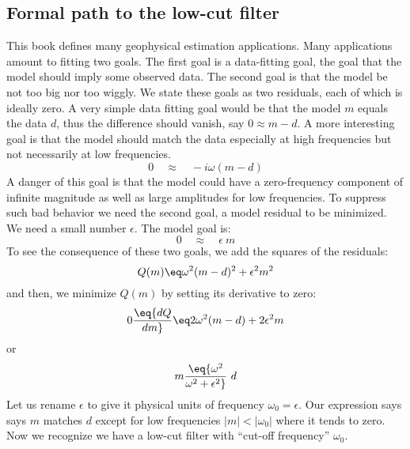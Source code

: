 \subsection{Formal path to the low-cut filter}

This book defines many geophysical estimation applications.
Many applications amount to fitting two goals.
The first goal is a data-fitting goal,
the goal that the model should imply some observed data.
The second goal is that the model be not too big nor too wiggly.
We state these goals as two residuals, each of which is ideally zero.
A very simple data fitting goal would be that
the model $m$ equals the data $d$,
thus the difference should vanish, say $0\approx  m- d$.
A more interesting goal is that the model should match the data
especially at high frequencies but not necessarily at low frequencies.
\begin{equation}
0 \quad\approx\quad  -i\omega(m - d)
\end{equation}
A danger of this goal is that the model could have a zero-frequency component
of infinite magnitude as well as large amplitudes for low frequencies.
To suppress such bad behavior we need the second goal, a model residual
to be minimized.  We need a small number $\epsilon$.
The model goal is:
\begin{equation}
0 \quad\approx\quad \epsilon \ m
\end{equation}
To see the consequence of these two goals,
we add the squares of the residuals:
\begin{equation}
 Q(m) \eq \omega^2 (m-d)^2 + \epsilon^2  m^2
\end{equation}
and then, we minimize $Q(m)$ by setting its derivative to zero:
\begin{equation}
0\eq {dQ\over dm} \eq 2 \omega^2 (m-d) + 2\epsilon^2  m
\end{equation}
or
\begin{equation}
m \eq  {\omega^2 \over \omega^2+ \epsilon^2}\  d
\label{eqn:lowcut}
\end{equation}
Let us rename $\epsilon$ to give it physical units of frequency $\omega_0 = \epsilon$.
Our expression says
says $m$ matches $d$ except for low frequencies $|m| <|\omega_0|$ where it tends to zero.
Now we recognize we have a low-cut filter with 
``cut-off frequency''  $\omega_0$.


